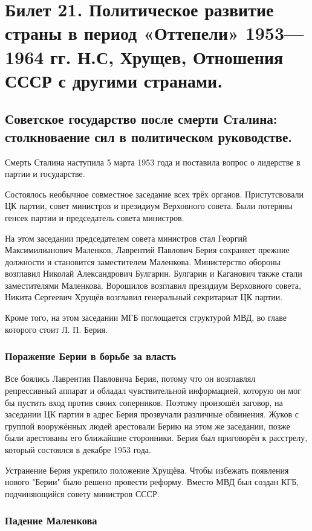 \section{ Билет 21. Политическое развитие страны в период «Оттепели» 1953—1964 гг. Н.С, Хрущев, Отношения СССР с другими странами.}

\subsection{Советское государство после смерти Сталина: столкноваение сил в политическом руководстве.}

Смерть Сталина наступила 5 марта 1953 года и поставила вопрос о лидерстве в партии и государстве.

Состоялось необычное совместное заседание всех трёх органов. Пристутсвовали ЦК партии, совет министров и президиум Верховного совета. Были потеряны генсек партии и председатель совета министров.

На этом заседании председателем совета министров стал Георгий Максимилианович Маленков, Лаврентий Павлович Берия сохраняет прежние должности и становится заместителем Маленкова. Министерство обороны возглавил Николай Александрович Булгарин. Булгарин и Каганович также стали заместителями Маленкова. Ворошилов возглавил президиум Верховного совета, Никита Сергеевич Хрущёв возглавил генеральный секритариат ЦК партии.

Кроме того, на этом заседании МГБ поглощается структурой МВД, во главе которого стоит Л. П. Берия.

\subsubsection{Поражение Берии в борьбе за власть}

Все боялись Лаврентия Павловича Берия, потому что он возглавлял репрессивный аппарат и обладал чувствительной информацией, которую он мог бы пустить вход против своих соперников. Поэтому произошёл заговор, на заседании ЦК партии в адрес Берия прозвучали различные обвинения. Жуков с группой вооружённых людей арестовали Берию на этом же заседании, позже были арестованы его ближайшие сторонники. Берия был приговорён к расстрелу, который состоялся в декабре 1953 года.

Устранение Берия укрепило положение Хрущёва. Чтобы избежать появления нового "Берии" было решено провести реформу. Вместо МВД был создан КГБ, подчиняющийся совету министров СССР.

\subsubsection{Падение Маленкова}

